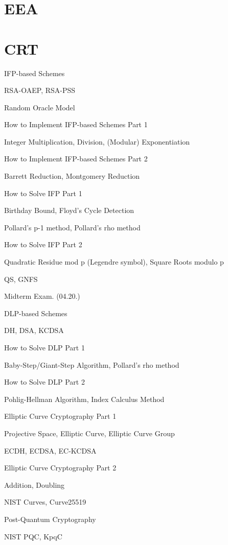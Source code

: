 \documentclass[12pt,openany]{book}
\begin{document}
	\section{EEA}
	\section{CRT}
	
	\newpage
	IFP-based Schemes
	
	RSA-OAEP, RSA-PSS
	
	Random Oracle Model
	
	
	How to Implement IFP-based Schemes Part 1
	
	Integer Multiplication, Division, (Modular) Exponentiation
	
	
	How to Implement IFP-based Schemes Part 2
	
	Barrett Reduction, Montgomery Reduction
	
	
	How to Solve IFP Part 1
	
	Birthday Bound, Floyd's Cycle Detection
	
	Pollard’s p-1 method, Pollard’s rho method
	
	
	How to Solve IFP Part 2
	
	Quadratic Residue mod p (Legendre symbol), Square Roots modulo p
	
	QS, GNFS
	
	
	Midterm Exam. (04.20.)
	
	
	DLP-based Schemes
	
	DH, DSA, KCDSA
	
	
	How to Solve DLP Part 1
	
	Baby-Step/Giant-Step Algorithm, Pollard’s rho method
	
	
	How to Solve DLP Part 2
	
	Pohlig-Hellman Algorithm, Index Calculus Method
	
	
	Elliptic Curve Cryptography Part 1
	
	Projective Space, Elliptic Curve, Elliptic Curve Group
	
	ECDH, ECDSA, EC-KCDSA
	
	
	Elliptic Curve Cryptography Part 2
	
	Addition, Doubling
	
	NIST Curves, Curve25519
	
	
	Post-Quantum Cryptography
	
	NIST PQC, KpqC
	
	
\end{document}
